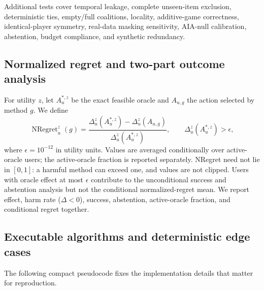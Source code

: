 \documentclass[pdflatex,sn-basic]{sn-jnl}
\begin{document}
Additional tests cover temporal leakage, complete unseen-item exclusion, deterministic ties, empty/full coalitions, locality, additive-game correctness, identical-player symmetry, real-data masking sensitivity, AIA-null calibration, abstention, budget compliance, and synthetic redundancy.

\subsection{Normalized regret and two-part outcome analysis}
For utility $z$, let $A_u^{*,z}$ be the exact feasible oracle and $A_{u,g}$ the action selected by method $g$. We define
\begin{equation}
\operatorname{NRegret}_u^z(g)=
\frac{\Delta_u^z(A_u^{*,z})-\Delta_u^z(A_{u,g})}
{\Delta_u^z(A_u^{*,z})},
\qquad \Delta_u^z(A_u^{*,z})>\epsilon,
\end{equation}
where $\epsilon=10^{-12}$ in utility units. Values are averaged conditionally over active-oracle users; the active-oracle fraction is reported separately. NRegret need not lie in $[0,1]$: a harmful method can exceed one, and values are not clipped. Users with oracle effect at most $\epsilon$ contribute to the unconditional success and abstention analysis but not the conditional normalized-regret mean. We report effect, harm rate ($\Delta<0$), success, abstention, active-oracle fraction, and conditional regret together.

\subsection{Executable algorithms and deterministic edge cases}
The following compact pseudocode fixes the implementation details that matter for reproduction.
\end{document}
